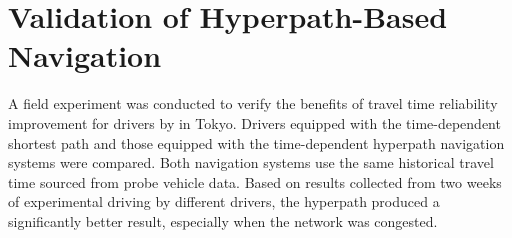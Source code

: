  
\section{Validation of Hyperpath-Based Navigation}
A field experiment was conducted to verify the benefits of travel time reliability improvement for drivers by \citet{Ito2015} in Tokyo. Drivers equipped with the time-dependent shortest path and those equipped with the time-dependent hyperpath navigation systems were compared. Both navigation systems use the same historical travel time sourced from probe vehicle data. Based on results collected from two weeks of experimental driving by different drivers, the hyperpath produced a significantly better result, especially when the network was congested. 


